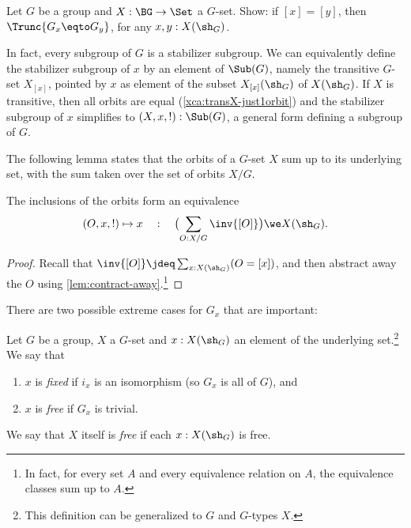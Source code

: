 \begin{xca}\label{xca:[x]=[y]-implies-||Gx=Gy||}
Let $G$ be a group and $X: \BG\to\Set$ a $G$-set. Show:
if $[x]=[y]$, then $\Trunc{G_x\eqto G_y}$, for any $x,y:X(\sh_G)$.
\end{xca}

\begin{remark}\label{rem:subgrp-is-stabsubgr}
  In fact, every subgroup of $G$ is a stabilizer subgroup.
  We can equivalently define the stabilizer subgroup of $x$ 
  by an element of $\Sub(G)$, namely
  the transitive $G$-set $X_{[x]}$, pointed by
  $x$ as element of the subset $X_{[x]}(\sh_G)$ of $X(\sh_G)$.
  If $X$ is transitive, then all orbits are equal (\cref{xca:transX-just1orbit})
  and the stabilizer subgroup of $x$ simplifies to $(X,x,!):\Sub(G)$,
  a general form defining a subgroup of $G$.
\end{remark}

The following lemma states that the orbits of a $G$-set $X$
sum up to its underlying set, with the sum taken over the set
of orbits $X/G$.

\begin{lemma}
  \label{lem:splitting into orbits}
  The inclusions of the orbits form an equivalence
\[
  (O,x,!)\mapsto x \quad:\quad
  \bigl(\sum_{O:X/G} \inv{[O]} \bigr) \we X(\sh_G).
\]
\end{lemma}
\begin{proof}
Recall that $\inv{[O]}\jdeq \sum_{x:X(\sh_G)}(O=[x])$, 
and then abstract
away the $O$ using \cref{lem:contract-away}.\footnote{%
In fact, for every set $A$ and every equivalence relation on $A$,
the equivalence classes sum up to $A$.}
\end{proof}

There are two possible extreme cases for $G_x$ that are important:
\begin{definition}\label{def:fixed-free}
  Let $G$ be a group, $X$ a $G$-set and $x:X(\sh_G)$ an element of the underlying set.\footnote{%
  This definition can be generalized to \inftygps $G$ and $G$-types $X$.}
  We say that
  \begin{enumerate}
  \item $x$ is \emph{fixed}
    if $i_x$ is an isomorphism (so $G_x$ is all of $G$), and
  \item $x$ is \emph{free}
    if $G_x$ is trivial.
  \end{enumerate}
  We say that $X$ itself is \emph{free} if each $x:X(\sh_G)$ is free.
\end{definition}

